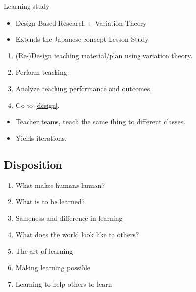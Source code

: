 \begin{frame}
  \begin{block}{Learning study~\cite{LearningStudy}}
    \begin{itemize}
      \item Design-Based Research + Variation Theory
      \item Extends the Japanese concept Lesson Study.
    \end{itemize}
    \pause
    \begin{enumerate}
      \item \label{design} (Re-)Design teaching material/plan using variation 
        theory.
      \item Perform teaching.
      \item Analyze teaching performance and outcomes.
      \item Go to \ref{design}.
    \end{enumerate}
  \end{block}

  \pause

  \begin{remark}
    \begin{itemize}
      \item Teacher teams, teach the same thing to different classes.
      \item Yields iterations.
    \end{itemize}
  \end{remark}
\end{frame}

\subsection{Disposition}

\begin{frame}
  \begin{enumerate}
    \item What makes humans human?
    \item What is to be learned?
    \item Sameness and difference in learning
    \item What does the world look like to others?
    \item The art of learning
    \item Making learning possible
    \item Learning to help others to learn
  \end{enumerate}
\end{frame}


